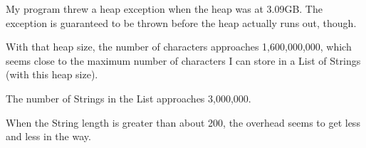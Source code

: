 My program threw a heap exception when the heap was at 3.09GB. The exception is guaranteed to be thrown before the heap actually runs out, though.

With that heap size, the number of characters approaches 1,600,000,000, which seems close to the maximum number of characters I can store in a List of Strings (with this heap size).

The number of Strings in the List approaches 3,000,000.

When the String length is greater than about 200, the overhead seems to get less and less in the way.